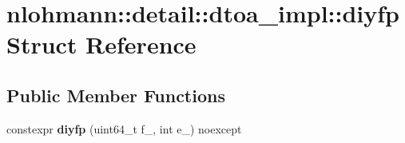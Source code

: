 \hypertarget{structnlohmann_1_1detail_1_1dtoa__impl_1_1diyfp}{}\section{nlohmann\+:\+:detail\+:\+:dtoa\+\_\+impl\+:\+:diyfp Struct Reference}
\label{structnlohmann_1_1detail_1_1dtoa__impl_1_1diyfp}
\subsection*{Public Member Functions}
\begin{DoxyCompactItemize}
\item 
constexpr {\bfseries diyfp} (uint64\+\_\+t f\+\_\+, int e\+\_\+) noexcept\hypertarget{structnlohmann_1_1detail_1_1dtoa__impl_1_1diyfp_a332ba792e67dd40cd99a23f6dceb7792}{}\label{structnlohmann_1_1detail_1_1dtoa__impl_1_1diyfp_a332ba792e67dd40cd99a23f6dceb7792}

\end{DoxyCompactItemize}
